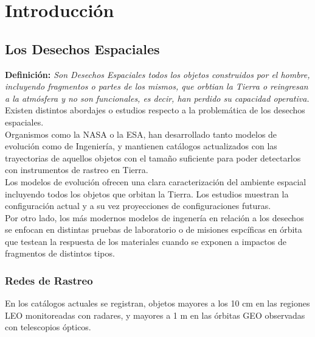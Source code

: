\chapter{Introducción}
\label{chap:introduccion}


\section{Los Desechos Espaciales}


{\bf{Definici\'on:}}{\it{ Son Desechos Espaciales todos los objetos construidos por el hombre, incluyendo fragmentos o partes de los mismos, que orbtian la Tierra o reingresan a la atm\'osfera y no son funcionales, es decir, han perdido su capacidad operativa.}} \citep{iadcguide}\\

Existen distintos abordajes o estudios respecto a la problem\'atica de los desechos espaciales.\\
Organismos como la NASA o la ESA, han desarrollado tanto modelos de evoluci\'on como de Ingenier\'ia, y mantienen cat\'alogos actualizados con las trayectorias de aquellos objetos con el tamaño suficiente para poder detectarlos con instrumentos de rastreo en Tierra.\\
Los modelos de evoluci\'on ofrecen una clara caracterizaci\'on del ambiente espacial incluyendo todos los objetos que orbitan la Tierra. Los estudios muestran la configuraci\'on actual y a su vez proyecciones de configuraciones futuras.\\
Por otro lado, los m\'as modernos modelos de ingener\'ia en relaci\'on a los desechos se enfocan en distintas pruebas de laboratorio o de misiones espc\'ificas en \'orbita que testean la respuesta de los materiales cuando se exponen a impactos de fragmentos de distintos tipos.\\






\subsection{Redes de Rastreo}

En los catálogos actuales se registran, objetos mayores a los 10 cm en las regiones LEO monitoreadas con radares, y mayores a 1 m en las órbitas GEO observadas con telescopios ópticos. 

